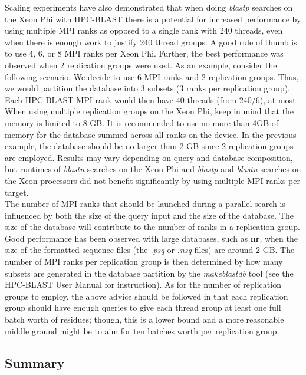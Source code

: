 \documentclass[10pt]{article}
\begin{document}
Scaling experiments have also demonstrated that when doing \emph{blastp} searches on the Xeon Phi with HPC-BLAST there is a potential for increased performance by
using multiple MPI ranks as opposed to a single rank with 240 threads, even when there is enough work to justify 240 thread groups.  A good rule of thumb is to use 4, 6, or 8
MPI ranks per Xeon Phi.  Further, the best performance was observed when 2 replication groups were used.  As an example, consider the following scenario.  We decide
to use 6 MPI ranks and 2 replication groups.  Thus, we would partition the database into 3 subsets (3 ranks per replication group).  Each HPC-BLAST MPI rank would then have
40 threads (from $240/6$), at most.  When using multiple replication groups on the Xeon Phi, keep in mind that the memory is limited to 8 GB. It is recommended to use no more than
4GB of memory for the database summed across all ranks on the device.  In the previous example, the database should be no larger than 2 GB since 2 replication groups are employed.
Results may vary depending on query and database composition, but runtimes of \emph{blastn} searches on the Xeon Phi and \emph{blastp} and \emph{blastn} searches on the
Xeon processors did not benefit significantly by using multiple MPI ranks per target.\\

The number of MPI ranks that should be launched during a parallel search is influenced by both the size of the query input and the size of the database.  The size of the database will contribute
to the number of ranks in a replication group.  Good performance has been observed with large databases, such as {\bf nr}, when the size of the formatted sequence files
(the \emph{.psq} or \emph{.nsq} files) are around 2 GB.  The number of MPI ranks per replication group is then determined by how many subsets are generated in the database partition by the
\emph{makeblastdb} tool (see the HPC-BLAST User Manual for instruction).  As for the number of replication groups to employ, the above advice should be followed in that each replication group should
have enough queries to give each thread group at least one full batch worth of residues; though, this is a lower bound and a more reasonable middle ground might be to aim for ten batches worth
per replication group.

\subsection{Summary} \label{ssec:summary}
\end{document}
